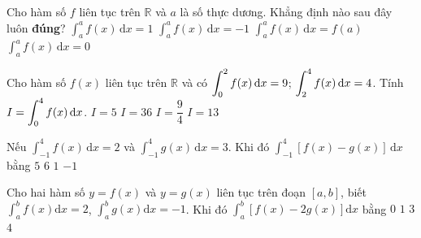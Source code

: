 \begin{ex}%
	Cho hàm số $f$ liên tục trên $\mathbb{R}$ và $a$ là số thực dương. Khẳng  định nào sau đây luôn \textbf{đúng}?
	\choice 
		{$\displaystyle\int^a_af(x)\mathrm{\,d}x=1$} 
		 {$\displaystyle\int^a_af(x)\mathrm{\,d}x=-1$}
		{$\displaystyle\int^a_af(x)\mathrm{\,d}x=f(a)$} 
		 {\True $\displaystyle\int^a_af(x)\mathrm{\,d}x=0$}
\end{ex}

\begin{ex}%
	Cho hàm số $f(x)$ liên tục trên $\mathbb{R}$ và có $\displaystyle\displaystyle\int_{0}^{2} f(x) \mathrm{\,d} x=9$;  $ \displaystyle\displaystyle\int_{2}^{4} f(x) \mathrm{\,d} x=4$. Tính $I=\displaystyle\displaystyle\int_{0}^{4} f(x) \mathrm{\,d} x$.
	 \choice
		{$I=5$} 
		{$I=36$} 
		{$I=\dfrac{9}{4}$} 
		{\True  $I=13$}
\end{ex}

\begin{ex}%
	Nếu $\displaystyle\int_{-1}^4{f(x)\mathrm{\,d}x}=2$ và $\displaystyle\int_{-1}^4{g(x)\mathrm{\,d}x}=3$.  Khi đó $\displaystyle\int_{-1}^4{\left[f(x)-g(x)\right]\mathrm{\,d}x}$ bằng
	 \choice
		{$5$} 
		 {$6$}
		{$1$} 
		 {\True $-1$}
\end{ex}

\begin{ex}%
	Cho hai hàm số $y = f(x)$ và $y = g(x)$ liên tục trên đoạn $[a, b]$,  biết
	$\displaystyle\int_a^b f(x) \mathrm{d}x  = 2$,
	 $\displaystyle\int_a^b g(x) \mathrm{d}x = -1$.
	Khi đó $\displaystyle\int_a^b  \left[f(x) - 2g(x)\right] \mathrm{d}x$ bằng
	 \choice
		{$0$} 
		 {$1$}
		 {$3$}
		{\True  $4$}
\end{ex}


